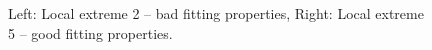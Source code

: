 \documentclass[review,times,3p,10pt]{elsarticle}
\begin{document}
\begin{figure}
\caption{Left: Local extreme 2 -- bad fitting properties, Right: Local extreme 5 -- good fitting properties.}
\label{rf0samples}
\end{figure}
\end{document}
